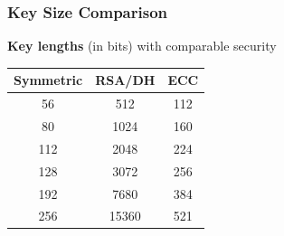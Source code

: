 \begin{frame}\frametitle{Key Size Comparison}
\begin{center}
\textbf{Key lengths} (in bits) with comparable security
\newline

\begin{tabular}{|c|c|c|} \hline
Symmetric & RSA/DH & ECC \\ \hline	
56 & 512 & 112 \\
80 & 1024 & 160 \\
112 & 2048 & 224 \\
128 & 3072 & 256 \\
192 & 7680 & 384 \\
256 & 15360 & 521 \\ \hline	
\end{tabular}	
\end{center}
\end{frame}

